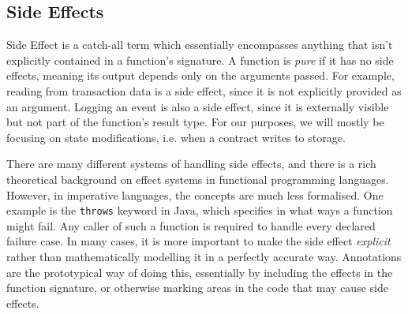 \subsection{Side Effects}
Side Effect is a catch-all term which essentially encompasses anything that isn't explicitly contained in a function's signature. A function is \textit{pure} if it has no side effects, meaning its output depends only on the arguments passed. For example, reading from transaction data is a side effect, since it is not explicitly provided as an argument. Logging an event is also a side effect, since it is externally visible but not part of the function's result type. For our purposes, we will mostly be focusing on state modifications, i.e. when a contract writes to storage.
\par
There are many different systems of handling side effects, and there is a rich theoretical background on effect systems in functional programming languages. However, in imperative languages, the concepts are much less formalised. One example is the \lstinline{throws} keyword in Java, which specifies in what ways a function might fail. Any caller of such a function is required to handle every declared failure case. In many cases, it is more important to make the side effect \textit{explicit} rather than mathematically modelling it in a perfectly accurate way. Annotations are the prototypical way of doing this, essentially by including the effects in the function signature, or otherwise marking areas in the code that may cause side effects.
